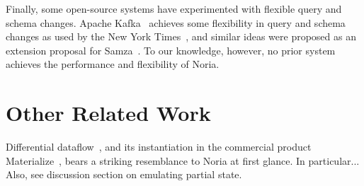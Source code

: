 Finally, some open-source systems have experimented with flexible query and
schema changes.
%
Apache Kafka~\cite{kafka} achieves some flexibility in query and schema
changes as used by the New York Times~\cite{nyt-kafka}, and
%
similar ideas were proposed as an extension proposal for
Samza~\cite{samza-blogpost}.
%
To our knowledge, however, no prior system achieves the performance and
flexibility of Noria.
%

\section{Other Related Work}

%

%
\begin{comment}
Shared Arrangements:
http://www.vldb.org/pvldb/vol13/p1793-mcsherry.pdf
\end{comment}

Differential dataflow~\cite{naiad,differential-dataflow}, and its instantiation
in the commercial product Materialize~\cite{materialize}, bears a striking
resemblance to Noria at first glance. In particular... Also, see discussion
section on emulating partial state.
